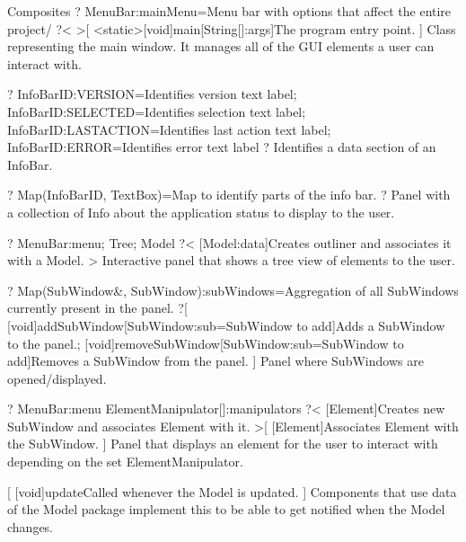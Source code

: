 \newpage
\begin{package}{Composites}
    ?
        MenuBar:mainMenu=Menu bar with options that affect the entire project/
    ?<
    >[
        \func{+}<static>[void]{main}[String[]:args]{The program entry point.}
    ]{
        Class representing the main window. It manages all of the GUI elements a user can interact with.
    }

    ?
            InfoBarID:VERSION=Identifies version text label;
            InfoBarID:SELECTED=Identifies selection text label;
            InfoBarID:LASTACTION=Identifies last action text label;
            InfoBarID:ERROR=Identifies error text label
        ?{
            Identifies a data section of an InfoBar.
        }

    ?
        Map(InfoBarID, TextBox)=Map to identify parts of the info bar.
        ?{
            Panel with a collection of Info about the application status to display to the user.
        }

    ?
            MenuBar:menu;
            Tree;
            Model
        ?<
            [Model:data]{Creates outliner and associates it with a Model.}
        >{
            Interactive panel that shows a tree view of elements to the user.
        }

    ?
        Map(SubWindow\&, SubWindow):subWindows=Aggregation of all SubWindows currently present in the panel.
    ?[
        \func{+}[void]{addSubWindow}[SubWindow:sub=SubWindow to add]{Adds a SubWindow to the panel.};
        \func{+}[void]{removeSubWindow}[SubWindow:sub=SubWindow to add]{Removes a SubWindow from the panel.}
    ]{
        Panel where SubWindows are opened/displayed.
    }

    ?
        MenuBar:menu
        ElementManipulator[]:manipulators
    ?<
        [Element]{Creates new SubWindow and associates Element with it.}
    >[
        [Element]{Associates Element with the SubWindow.}
    ]{
        Panel that displays an element for the user to interact with depending on the set ElementManipulator.
    }

    [
        \func{+}[void]{update}{Called whenever the Model is updated.}
    ]{
        Components that use data of the Model package implement this to be able to get notified when the Model changes.
    }


\end{package}
